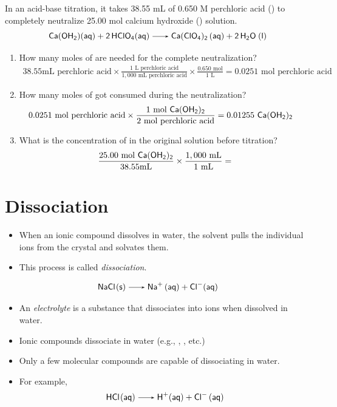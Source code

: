 \documentclass[
	chapter=4
]{chem122notes}
\begin{document}
In an acid-base titration, it takes 38.55 mL of 0.650 M perchloric acid () to completely neutralize 25.00 mol calcium hydroxide () solution.
\[ \ce{Ca(OH2)(aq) + 2HClO4(aq) -> Ca(ClO4)2 (aq) + 2H2O (l) } \]
\begin{enumerate}[label=\Alph*)]
	\item How many moles of  are needed for the complete neutralization?
	\begin{equation*}
	\begin{aligned}
		38.55\mbox{mL perchloric acid} \times \frac{1 \mbox{ L perchloric acid}}{1,000 \mbox{ mL perchloric acid}} \times \frac{0.650 \mbox{ mol}}{1 \mbox{ L}} = 0.0251 \mbox{ mol perchloric acid}
	\end{aligned}
	\end{equation*}
	\item How many moles of  got consumed during the neutralization?
	\begin{equation*}
	\begin{aligned}
		0.0251 \mbox{ mol perchloric acid} \times \frac{1 \mbox{ mol } \ce{Ca(OH2)2}}{2 \mbox{ mol perchloric acid}} &= 0.01255 \ \ce{Ca(OH2)2}
	\end{aligned}
	\end{equation*}
	\item What is the concentration of  in the original solution before titration?
	\begin{equation*}
	\begin{aligned}
		\frac{25.00 \mbox{ mol } \ce{Ca(OH2)2}}{38.55 \mbox{mL}} \times \frac{1,000 \mbox{ mL}}{1 \mbox{ mL}} =
	\end{aligned}
	\end{equation*}
\end{enumerate}

\section{Dissociation}\label{sec:dissociation}
\begin{itemize}
	\item When an ionic compound dissolves in water, the solvent pulls the individual ions from the crystal and solvates them.
	\item This process is called \emph{dissociation}.
\end{itemize}
\[ \ce{NaCl(s) -> Na+ (aq) + Cl-(aq)} \]
\begin{itemize}
	\item An \emph{electrolyte} is a substance that dissociates into ions when dissolved in water.
	\item Ionic compounds dissociate in water (e.g., , , etc.)
	\item Only a few molecular compounds are capable of dissociating in water.
	\item For example, \[ \ce{HCl(aq) -> H+(aq) + Cl- (aq)} \]
\end{itemize}
\end{document}
